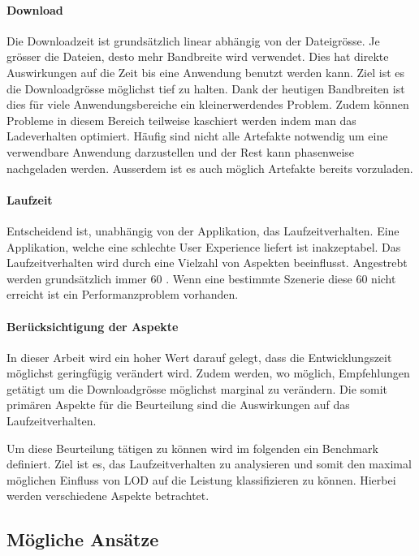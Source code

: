 \paragraph{Download}

Die Downloadzeit ist grundsätzlich linear abhängig von der Dateigrösse.
Je grösser die Dateien, desto mehr Bandbreite wird verwendet. Dies hat direkte Auswirkungen auf die Zeit bis eine Anwendung benutzt werden kann. Ziel ist es die Downloadgrösse möglichst tief zu halten.
Dank der heutigen Bandbreiten ist dies für viele Anwendungsbereiche ein kleinerwerdendes Problem.
Zudem können Probleme in diesem Bereich teilweise kaschiert werden indem man das Ladeverhalten optimiert. Häufig sind nicht alle Artefakte notwendig um eine verwendbare Anwendung darzustellen und der Rest kann phasenweise nachgeladen werden.
Ausserdem ist es auch möglich Artefakte bereits vorzuladen.

\paragraph{Laufzeit}

Entscheidend ist, unabhängig von der Applikation, das Laufzeitverhalten. Eine Applikation, welche eine schlechte User Experience liefert ist inakzeptabel.
Das Laufzeitverhalten wird durch eine Vielzahl von Aspekten beeinflusst.
Angestrebt werden grundsätzlich immer 60 . Wenn eine bestimmte Szenerie diese 60  nicht erreicht ist ein Performanzproblem vorhanden.

\paragraph{Berücksichtigung der Aspekte}
In dieser Arbeit wird ein hoher Wert darauf gelegt, dass die Entwicklungszeit möglichst geringfügig verändert wird. Zudem werden, wo möglich, Empfehlungen getätigt um die Downloadgrösse möglichst marginal zu verändern.
Die somit primären Aspekte für die Beurteilung sind die Auswirkungen auf das Laufzeitverhalten.

Um diese Beurteilung tätigen zu können wird im folgenden ein Benchmark definiert. Ziel ist es, das Laufzeitverhalten zu analysieren und somit den maximal möglichen Einfluss von LOD auf die Leistung klassifizieren zu können. Hierbei werden verschiedene Aspekte betrachtet.

\subsection{Mögliche Ansätze}

